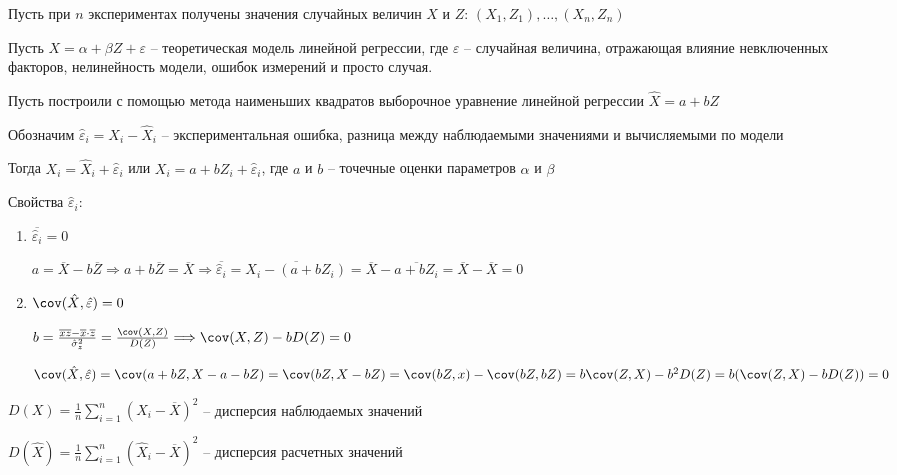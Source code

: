 \begin{enumerate}
    Пусть при $n$ экспериментах получены значения случайных величин $X$ и $Z$: $(X_1, Z_1), \dots, (X_n, Z_n)$

    Пусть $X = \alpha + \beta Z + \varepsilon$ -- теоретическая модель линейной регрессии, где $\varepsilon$ -- случайная величина,
    отражающая влияние невключенных факторов, нелинейность модели, ошибок измерений и просто случая.

    Пусть построили с помощью метода наименьших квадратов выборочное уравнение линейной регрессии $\hat X = a + b Z$

    Обозначим $\hat \varepsilon_i = X_i - \hat X_i$ -- экспериментальная ошибка, разница между наблюдаемыми значениями и 
    вычисляемыми по модели

    Тогда $X_i = \hat X_i + \hat \varepsilon_i$ или $X_i = a + b Z_i + \hat \varepsilon_i$, где $a$ и $b$ -- точечные оценки параметров $\alpha$ и $\beta$

    Свойства $\hat \varepsilon_i$:

    \begin{enumerate}
        \item $\overline{\hat \varepsilon_i} = 0$

        \begin{MyProof}
            $a = \overline{X} - b \overline{Z} \Longrightarrow a + b \overline{Z} = \overline{X} \Longrightarrow \overline{\hat \varepsilon_i} = \overline{X_i - (a + b Z_i)} = \overline{X} - \overline{a + b Z_i} = \overline{X} - \overline{X} = 0$
        \end{MyProof}

        \item $\cov (\hat X, \hat \varepsilon) = 0$

        \begin{MyProof}
            $b = \frac{\overline{xz} - \overline{x} \cdot \overline{z}}{\hat \sigma^2_z} = \frac{\cov (X, Z)}{D(Z)} \Longrightarrow \cov (X, Z) - b D(Z) = 0$

            $\cov (\hat X, \hat \varepsilon) = \cov (a + b Z, X - a - bZ) = \cov (bZ, X - bZ) = \cov (bZ, x) - \cov (bZ, bZ) = b \cov (Z, X) - b^2 D(Z) = b (\cov (Z, X) - b D(Z)) = 0$
        \end{MyProof}
    \end{enumerate}

    \Def $D(X) = \frac{1}{n} \sum_{i = 1}^n (X_i - \overline{X})^2$ -- дисперсия наблюдаемых значений

    \Defs $D(\hat X) = \frac{1}{n} \sum_{i = 1}^n (\hat X_i - \overline{X})^2$ -- дисперсия расчетных значений


\end{enumerate}
